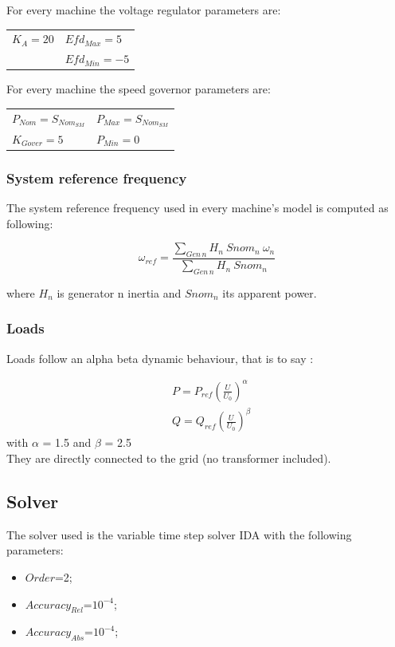 \documentclass[a4paper, 12pt]{report}
\begin{document}
For every machine the voltage regulator parameters are:
\begin{center}
\begin{tabular}{l|l}
   $K_A=20$ & $Efd_{Max}=5$  \\
    & $Efd_{Min}=-5$   \\
\end{tabular}
\end{center}

For every machine the speed governor parameters are:
\begin{center}
\begin{tabular}{l|l}
   $P_{Nom}=S_{Nom_{SM}}$ & $P_{Max}=S_{Nom_{SM}}$  \\
   $K_{Gover}=5$ & $P_{Min}=0$   \\
\end{tabular}
\end{center}

\subsubsection{System reference frequency}

The system reference frequency used in every machine's model is computed as following:

\[
 \omega_{ref} = \frac{\sum_{Gen \hspace{2pt} n} H_{n} \ Snom_{n} \ \omega_{n}}{\sum_{Gen \hspace{2pt} n} H_{n} \ Snom_{n}}
\]

where $H_{n}$ is generator n inertia and $Snom_{n}$ its apparent power.
\subsubsection{Loads}

Loads follow an alpha beta dynamic behaviour, that is to say :

\[
\begin{aligned}
& P = P_{ref} (\frac{U}{U_{0}})^\alpha \\
& Q = Q_{ref} (\frac{U}{U_{0}})^\beta
\end{aligned}
\]
with $\alpha$ = 1.5 and $\beta$ = 2.5 \\
They are directly connected to the grid (no transformer included).


\subsection{Solver}
The solver used is the variable time step solver IDA with the following parameters:
\begin{itemize}
\item $Order$=2;
\item $Accuracy_{Rel}$=$10^{-4}$;
\item $Accuracy_{Abs}$=$10^{-4}$;
\end{itemize}
\end{document}
